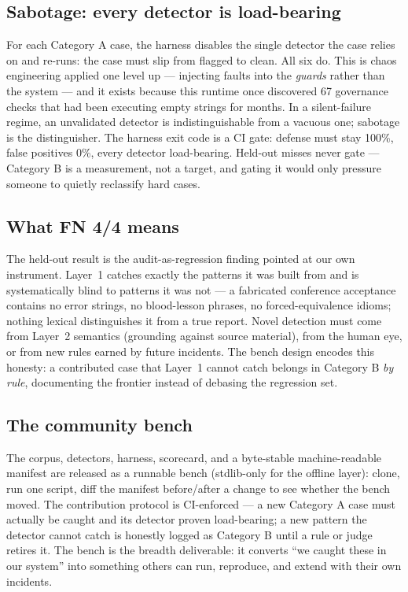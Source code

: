 \documentclass[11pt]{article}
\begin{document}
\subsection{Sabotage: every detector is load-bearing}
\label{sec:sabotage}

For each Category A case, the harness disables the single detector the
case relies on and re-runs: the case must slip from flagged to clean.
All six do. This is chaos engineering \cite{basiri2016chaos} applied
one level up --- injecting faults into the \emph{guards} rather than
the system --- and it exists because this runtime once discovered 67
governance checks that had been executing empty strings for months. In
a silent-failure regime, an unvalidated detector is indistinguishable
from a vacuous one; sabotage is the distinguisher. The harness exit
code is a CI gate: defense must stay 100\%, false positives 0\%, every
detector load-bearing. Held-out misses never gate --- Category B is a
measurement, not a target, and gating it would only pressure someone to
quietly reclassify hard cases.

\subsection{What FN 4/4 means}
\label{sec:fn44}

The held-out result is the audit-as-regression finding pointed at our
own instrument. Layer~1 catches exactly the patterns it was built from
and is systematically blind to patterns it was not --- a fabricated
conference acceptance contains no error strings, no blood-lesson
phrases, no forced-equivalence idioms; nothing lexical distinguishes it
from a true report. Novel detection must come from Layer~2 semantics
(grounding against source material), from the human eye, or from new
rules earned by future incidents. The bench design encodes this
honesty: a contributed case that Layer~1 cannot catch belongs in
Category B \emph{by rule}, documenting the frontier instead of debasing
the regression set.

\subsection{The community bench}

The corpus, detectors, harness, scorecard, and a byte-stable
machine-readable manifest are released as a runnable bench (stdlib-only
for the offline layer): clone, run one script, diff the manifest
before/after a change to see whether the bench moved. The contribution
protocol is CI-enforced --- a new Category A case must actually be
caught and its detector proven load-bearing; a new pattern the detector
cannot catch is honestly logged as Category B until a rule or judge
retires it. The bench is the breadth deliverable: it converts ``we
caught these in our system'' into something others can run, reproduce,
and extend with their own incidents.
\end{document}
